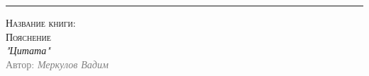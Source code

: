 \begin{titlepage}
	\raggedleft
	\rule{1pt}{\textheight}
	\hspace{0.05\textwidth}
	\parbox[b]{0.75\textwidth}{
		{\Huge\textsc{Название книги: \\ Пояснение}}\\[1\baselineskip]
		{\large\textit{"Цитата"}}\\[4\baselineskip]
		\textcolor{gray}{\large{Автор: \textit{Меркулов Вадим}}}
		\vspace{0.5\textheight}
		}
\end{titlepage}